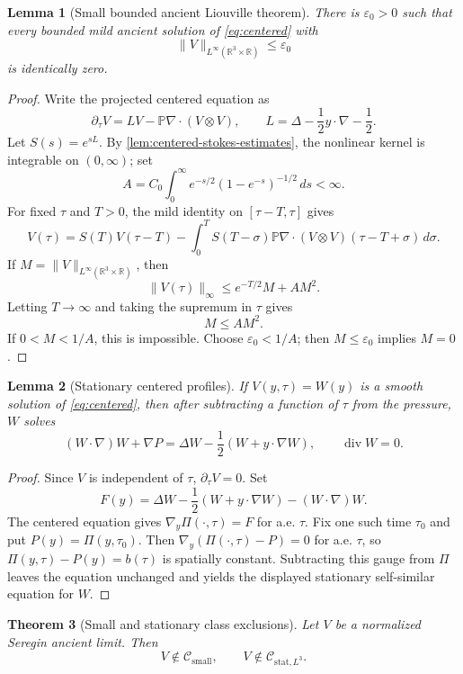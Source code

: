 \documentclass[11pt]{amsart}
\theoremstyle{plain}
\newtheorem{theorem}{Theorem}[section]
\newtheorem{lemma}[theorem]{Lemma}
\theoremstyle{definition}
\theoremstyle{remark}
\numberwithin{equation}{section}
\newcommand{\R}{\mathbb R}
\newcommand{\divergence}{\operatorname{div}}
\newcommand{\calC}{\mathcal C}
\begin{document}
\begin{lemma}[Small bounded ancient Liouville theorem]\label{lem:small-liouville}
There is \(\varepsilon_0>0\) such that every bounded mild ancient solution of
\eqref{eq:centered} with
\[
   \|V\|_{L^\infty(\R^3\times\R)}\le\varepsilon_0
\]
is identically zero.
\end{lemma}

\begin{proof}
Write the projected centered equation as
\[
   \partial_\tau V=LV-\mathbb P\nabla\cdot(V\otimes V),
   \qquad
   L=\Delta-\frac12 y\cdot\nabla-\frac12.
\]
Let \(S(s)=e^{sL}\).  By \cref{lem:centered-stokes-estimates}, the nonlinear
kernel is integrable on \((0,\infty)\); set
\[
   A=C_0\int_0^\infty e^{-s/2}(1-e^{-s})^{-1/2}\,ds<\infty .
\]
For fixed \(\tau\) and \(T>0\), the mild identity on \([\tau-T,\tau]\) gives
\[
   V(\tau)
   =
   S(T)V(\tau-T)
   -
   \int_0^T
   S(T-\sigma)\mathbb P\nabla\cdot(V\otimes V)(\tau-T+\sigma)\,d\sigma .
\]
If \(M=\|V\|_{L^\infty(\R^3\times\R)}\), then
\[
   \|V(\tau)\|_\infty\le e^{-T/2}M+AM^2.
\]
Letting \(T\to\infty\) and taking the supremum in \(\tau\) gives
\[
   M\le AM^2.
\]
If \(0<M<1/A\), this is impossible.  Choose \(\varepsilon_0<1/A\); then
\(M\le\varepsilon_0\) implies \(M=0\).
\end{proof}

\begin{lemma}[Stationary centered profiles]\label{lem:stationary-profile}
If \(V(y,\tau)=W(y)\) is a smooth solution of \eqref{eq:centered}, then after
subtracting a function of \(\tau\) from the pressure, \(W\) solves
\[
   (W\cdot\nabla)W+\nabla P
   =
   \Delta W-\frac12(W+y\cdot\nabla W),
   \qquad \divergence W=0.
\]
\end{lemma}

\begin{proof}
Since \(V\) is independent of \(\tau\), \(\partial_\tau V=0\).  Set
\[
   F(y)=
   \Delta W-\frac12(W+y\cdot\nabla W)-(W\cdot\nabla)W .
\]
The centered equation gives \(\nabla_y\Pi(\cdot,\tau)=F\) for a.e. \(\tau\).
Fix one such time \(\tau_0\) and put \(P(y)=\Pi(y,\tau_0)\).  Then
\(\nabla_y(\Pi(\cdot,\tau)-P)=0\) for a.e. \(\tau\), so
\(\Pi(y,\tau)-P(y)=b(\tau)\) is spatially constant.  Subtracting this gauge
from \(\Pi\) leaves the equation unchanged and yields the displayed
stationary self-similar equation for \(W\).
\end{proof}

\begin{theorem}[Small and stationary class exclusions]
\label{thm:classical-classes}
Let \(V\) be a normalized Seregin ancient limit.  Then
\[
   V\notin \calC_{\mathrm{small}},
   \qquad
   V\notin \calC_{\mathrm{stat},L^3}.
\]
\end{theorem}
\end{document}
